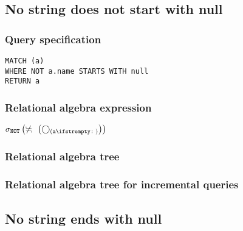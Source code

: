 \subsection{No string does not start with null}

\subsubsection*{Query specification}

\begin{lstlisting}
MATCH (a)
WHERE NOT a.name STARTS WITH null
RETURN a
\end{lstlisting}

\subsubsection*{Relational algebra expression}

$\selection{\mathtt{NOT}} \left(\alldifferent{} \left(\getvertices{a}{}\right)\right)$

\subsubsection*{Relational algebra tree}


\subsubsection*{Relational algebra tree for incremental queries}


\subsection{No string ends with null}

